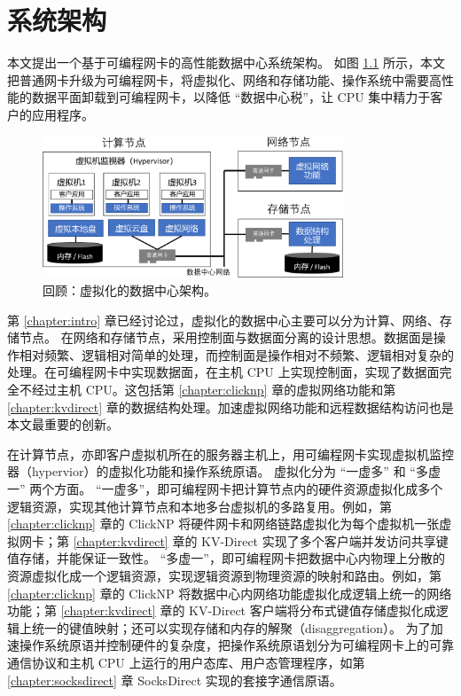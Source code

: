 \chapter{系统架构}

本文提出一个基于可编程网卡的高性能数据中心系统架构。
如图 \ref{arch:fig:virt-architecture} 所示，本文把普通网卡升级为可编程网卡，将虚拟化、网络和存储功能、操作系统中需要高性能的数据平面卸载到可编程网卡，以降低 ``数据中心税''，让 CPU 集中精力于客户的应用程序。


\begin{figure}[htbp]
	\centering
	\includegraphics[width=0.8\textwidth]{figures/virt_arch.pdf}
	\caption{回顾：虚拟化的数据中心架构。}
	\label{arch:fig:virt-architecture}
\end{figure}

第 \ref{chapter:intro} 章已经讨论过，虚拟化的数据中心主要可以分为计算、网络、存储节点。
在网络和存储节点，采用控制面与数据面分离的设计思想。数据面是操作相对频繁、逻辑相对简单的处理，而控制面是操作相对不频繁、逻辑相对复杂的处理。在可编程网卡中实现数据面，在主机 CPU 上实现控制面，实现了数据面完全不经过主机 CPU。这包括第 \ref{chapter:clicknp} 章的虚拟网络功能和第 \ref{chapter:kvdirect} 章的数据结构处理。加速虚拟网络功能和远程数据结构访问也是本文最重要的创新。

在计算节点，亦即客户虚拟机所在的服务器主机上，用可编程网卡实现虚拟机监控器（hypervior）的虚拟化功能和操作系统原语。
虚拟化分为 ``一虚多'' 和 ``多虚一'' 两个方面。
``一虚多''，即可编程网卡把计算节点内的硬件资源虚拟化成多个逻辑资源，实现其他计算节点和本地多台虚拟机的多路复用。例如，第 \ref{chapter:clicknp} 章的 ClickNP 将硬件网卡和网络链路虚拟化为每个虚拟机一张虚拟网卡；第 \ref{chapter:kvdirect} 章的 KV-Direct 实现了多个客户端并发访问共享键值存储，并能保证一致性。
``多虚一''，即可编程网卡把数据中心内物理上分散的资源虚拟化成一个逻辑资源，实现逻辑资源到物理资源的映射和路由。例如，第 \ref{chapter:clicknp} 章的 ClickNP 将数据中心内网络功能虚拟化成逻辑上统一的网络功能；第 \ref{chapter:kvdirect} 章的 KV-Direct 客户端将分布式键值存储虚拟化成逻辑上统一的键值映射；还可以实现存储和内存的解聚（disaggregation）。
为了加速操作系统原语并控制硬件的复杂度，把操作系统原语划分为可编程网卡上的可靠通信协议和主机 CPU 上运行的用户态库、用户态管理程序，如第 \ref{chapter:socksdirect} 章 SocksDirect 实现的套接字通信原语。

